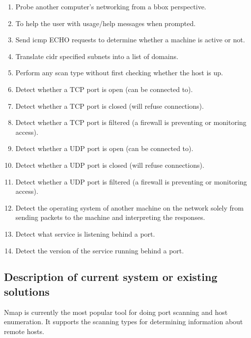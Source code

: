 \documentclass[titlepage]{article}
\let\Oldsubsection\subsection{}
\renewcommand{\subsection}{\FloatBarrier\Oldsubsection}
\begin{document}
\begin{enumerate}

  \item{%
    Probe another computer's networking from a \gls{bbox} perspective.
  }\label{blackbox}
  \item{%
    To help the user with usage/help messages when prompted.  
  }\label{usage}
  \item{%
    Send \gls{icmp} ECHO requests to determine whether a machine is active
    or not.
  }\label{ping}
  \item{%
    Translate \gls{cidr} specified subnets into a list of domains.
  }\label{cidr}
  \item{%
    Perform any scan type without first checking whether the host is up.
  }\label{nocheck}
  \item{%
    Detect whether a TCP port is open (can be connected to).
  }\label{tcpopen}
  \item{%
    Detect whether a TCP port is closed (will refuse connections).
  }\label{tcpclosed}
  \item{%
    Detect whether a TCP port is filtered (a firewall is
    preventing or monitoring access).
  }\label{tcpfiltered}
  \item{%
    Detect whether a UDP port is open (can be connected to).
  }\label{udpopen}
  \item{%
    Detect whether a UDP port is closed (will refuse connections).
  }\label{udpclosed}
  \item{%
    Detect whether a UDP port is filtered (a firewall is
    preventing or monitoring access).
  }\label{udpfiltered}
  \item{%
    Detect the operating system of another machine on the network
    solely from sending packets to the machine and interpreting the responses.
  }\label{osdetect}
  \item{%
    Detect what service is listening behind a port.
  }\label{servicedetect}
  \item{%
    Detect the version of the service running behind a port.
  }\label{versiondetect}

\end{enumerate}

\subsection{Description of current system or existing solutions}

Nmap is currently the most popular tool for doing \gls{port} scanning and host enumeration.
It supports the scanning types for determining information about remote hosts.
\end{document}
